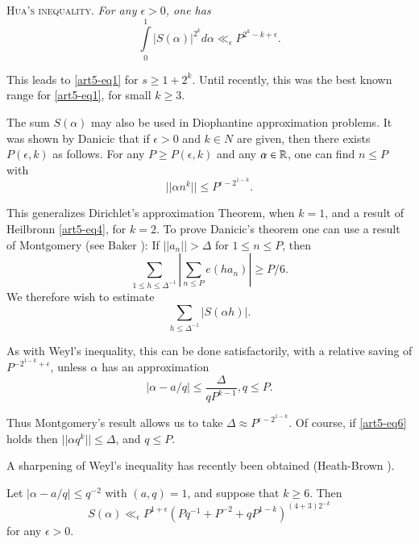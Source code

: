 \textsc{Hua's inequality.} \textit{For any $\epsilon >0$, one has}
$$
\int\limits^1_0 |S(\alpha)|^{2^k} d\alpha \ll_\epsilon P^{2^k -k + \epsilon}.
$$

This leads to \eqref{art5-eq1} for $s \geqslant 1+ 2^k$. Until recently, this was the best known range for \eqref{art5-eq1}, for small $k \geqslant 3$.

The sum $S(\alpha)$ may also be used in Diophantine approximation problems. It was shown by Danicic \cite{art5-key2} that if $\epsilon >0$ and $k \in N$ are given, then there exists $P(\epsilon, k)$ as follows. For any $P \geqslant P(\epsilon, k)$ and any $\alpha \in \mathbb{R}$, one can find $n \leqslant P$ with 
\begin{equation}
||\alpha n^k || \leqslant P^{\epsilon -2^{1-k}}. \label{art5-eq4}
\end{equation}

This generalizes Dirichlet's approximation Theorem, when $k=1$, and a result of Heilbronn \eqref{art5-eq4}, for $k=2$. To prove Danicic's theorem one can use a result of Montgomery (see Baker \cite[Theorem 2.2]{art5-key1}): If $||a_n|| >\Delta$ for $1\leqslant n \leqslant P$, then
$$
\sum\limits_{1 \leqslant h \leqslant \Delta^{-1}} |\sum\limits_{n\leqslant P} e(ha_n)| \geqslant  P/6.
$$
We therefore wish to estimate
\begin{equation}
\sum\limits_{h \leqslant \Delta^{-1}} |S(\alpha h)|. \label{art5-eq5}
\end{equation}

As with Weyl's inequality, this can be done satisfactorily, with a relative saving of $P^{-2^{1-k} + \epsilon}$, unless $\alpha$ has an approximation
\begin{equation}
|\alpha - a/q| \leqslant \frac{\Delta}{q P^{k-1}}, q \leqslant P.  \label{art5-eq6}
\end{equation}

Thus Montgomery's result allows us to take $\Delta \approx P^{\epsilon -2^{1-k}}$. Of course, if \eqref{art5-eq6} holds then $||\alpha q^k|| \leqslant \Delta$, and $q \leqslant P$.

A sharpening of Weyl's inequality has recently been obtained (Heath-Brown \cite{art5-key3}).

\begin{theorem}\label{art5-thm1}
Let $|\alpha - a/q|\leqslant q^{-2}$ with $(a, q) =1$, and suppose that $k \geqslant 6$. Then
$$
S(\alpha) \ll_\epsilon P^{1+\epsilon} (Pq^{-1} + P^{-2} + qP^{1-k})^{(4+3)2^{-k}}
$$
for any $\epsilon >0$.
\end{theorem}

